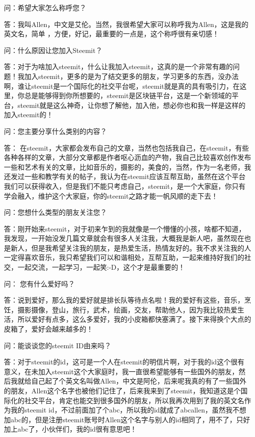 \documentclass[]{ctexbook}
\begin{document}
问：希望大家怎么称呼您？

答：我叫Allen，中文是艾伦。当然，我很希望大家可以称呼我为Allen，这是我的英文名，简单 ，方便，好记，最重要的一点是，这个称呼很有亲切感！

问：什么原因让您加入Steemit？

答：对于为啥加入steemit，什么让我加入steemit，这真的是一个非常有趣的问题！我加入steemit，更多的是为了结交更多的朋友，学习更多的东西，没办法啊，谁让steemit是一个国际化的社交平台呢，steemit就是真的具有吸引力，在这里，你总是能够得到你所想要的，steemit是区块链平台，这是一个新领域的平台，steemit就是这么神奇，让你想了解他，加入他，想必你也和我一样是这样的加入steemit的！

问：您主要分享什么类别的内容？

答： 在steemit，大家都会发布自己的文章，当然也包括我自己，在steemit，有些各种各样的文章，大部分文章都是作者呕心沥血的产物，我自己比较喜欢创作发布一些和艺术有关的文章，比如音乐的，摄影的，美食的，当然，作为一名老师，我还发过一些和教学有关的帖子，我认为在steemit应该互帮互助，虽然在这个平台我们可以获得收入，但是我们不能只考虑自己，steemit，是一个大家庭，你只有学会融入，维护这个大家庭，你的steemit之路才能一帆风顺的走下去！

问：您想什么类型的朋友关注您？

答：刚开始来steemit，对于初来乍到的我就像是一个懵懂的小孩，啥都不知道，我发现，一开始没发几篇文章就会有很多人关注我，大概我是新人吧，虽然现在也是新人，但是我希望关注我的朋友，是热爱生活，热情友好的。我不求关注我的人一定得喜欢音乐，我只希望我们可以和谐相处，互帮互助，一起来维持好我们的社交，一起交流，一起学习，一起笑:-D，这个才是最重要的！

问： 您有什么爱好吗？

答：说到爱好，那么我的爱好就是排长队等待点名啦！我的爱好有这些，音乐，烹饪，摄影摄像，登山，旅行，武术，绘画，交友，帮助他人，因为我比较热爱生活，所以爱好有点多，这么多爱好，我的小皮箱都快塞满了。接下来得换个大点的皮箱了，爱好会越来越多的！

问：能谈谈您的steemit ID由来吗？

答：对于steemit的id，这可是一个人在steemit的明信片啊，对于我的id这个很有意义，在未加入steemit这个大家庭时，我一直很希望能够有一些国外的朋友，然后我就给自己起了个英文名叫做Allen，中文是阿伦，后来呢我真的有了一些国外的朋友，Allen这个名字也被他们记住了，后来我来到了steemit，我知道这是个国际化的社交平台，肯定也能交到很多国外的朋友，所以我再次用到了我的英文名作为我的steemit id，不过前面加了个abc，所以我的id就成了abcallen，虽然我不想加abc的，但是注册steemit账号时Allen这个名字与别人的id相同了，用不了，只好加上abc了，小伙伴们，我的id很有意思吧！
\end{document}
